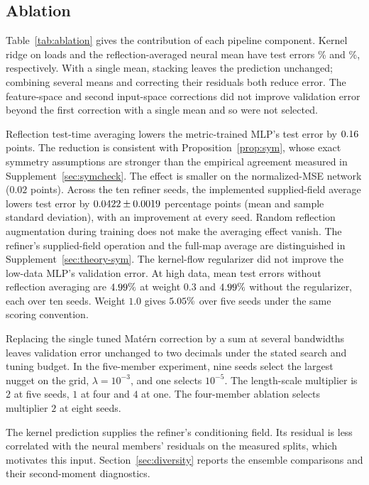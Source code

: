\subsection{Ablation}
\label{sec:ablation}
Table~\ref{tab:ablation} gives the contribution of each pipeline component.
Kernel ridge on loads and the reflection-averaged neural mean have test
errors \errKRRload\% and \errMLP\%, respectively. With a single mean,
stacking leaves the prediction unchanged; combining several means and
correcting their residuals both reduce error. The feature-space
and second input-space corrections did not improve validation error beyond the
first correction with a single mean and so were not selected.

Reflection test-time averaging lowers the metric-trained MLP's test error by
$0.16$ points. The reduction is consistent with Proposition~\ref{prop:sym}, whose exact
symmetry assumptions are stronger than the empirical agreement measured
in Supplement~\ref{sec:symcheck}. The effect is smaller on the
normalized-MSE network ($0.02$ points). Across the ten refiner seeds,
the implemented supplied-field average lowers test error by
$0.0422\pm0.0019$ percentage points (mean and sample standard deviation),
with an improvement at every seed. Random reflection augmentation during
training does not make the averaging effect vanish. The refiner's supplied-field operation and the full-map average are
distinguished in Supplement~\ref{sec:theory-sym}.
The kernel-flow regularizer did not improve
the low-data MLP's validation error. At high data, mean test errors without
reflection averaging are $4.99\%$ at weight $0.3$ and
$4.99\%$ without the regularizer, each over ten seeds. Weight $1.0$
gives $5.05\%$ over five seeds under the same scoring convention.

Replacing the single tuned Mat\'ern correction by a sum at several bandwidths
leaves validation error unchanged to two decimals under the stated search
and tuning budget. In the five-member experiment, nine seeds select the largest nugget
on the grid, $\lambda=10^{-3}$, and one selects $10^{-5}$. The length-scale
multiplier is $2$ at five seeds, $1$ at four and $4$ at one. The four-member
ablation selects multiplier $2$ at eight seeds.

The kernel prediction supplies the refiner's conditioning field. Its residual
is less correlated with the neural members' residuals on the measured splits,
which motivates this input. Section~\ref{sec:diversity} reports the
ensemble comparisons and their second-moment diagnostics.

